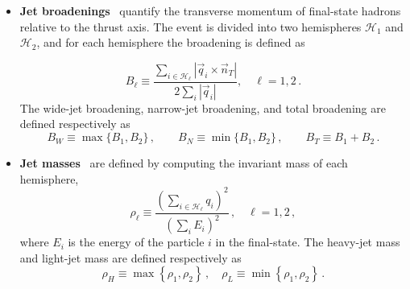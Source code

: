 \begin{itemize}
\begin{figure}[H]
\caption{Diagrammatic representation of thrust. Left: $\tau \to 0$ corresponds to a pencil-like 2-jet configuration, where the thrust axis $\vec{n}_T$ separates the event into two hemispheres, $\mathcal{H}_1$ and $\mathcal{H}_2$. Right:  $\tau \to 1/2$ corresponds to a spherically distributed, multi-particle final state.}
\label{fig:thrust}
\end{figure}


\item \textbf{Jet broadenings}~\cite{Clavelli:1979md, Rakow:1981qn, 
Catani:1992jc} quantify the transverse momentum of final-state hadrons 
relative to the thrust axis. The event is divided into two hemispheres 
$\mathcal{H}_1$ and $\mathcal{H}_2$, and for each hemisphere the 
broadening is defined as

\begin{equation}
	B_\ell \equiv \frac{\sum_{i \in \mathcal{H}_\ell} |\vec{q}_i \times \vec{n}_T|}{2 \sum_i |\vec{q}_i|}, \quad \ell = 1, 2\,.
\end{equation}
The wide-jet broadening, narrow-jet broadening, and total 
broadening are defined respectively as  
\begin{equation}
    B_W \equiv \max\{B_1, B_2\}\,, \qquad 
    B_N \equiv \min\{B_1, B_2\}\,, \qquad 
    B_T \equiv B_1 + B_2\,.
\end{equation}

\item{\textbf{Jet masses}}~\cite{Chandramohan:1980ry, Clavelli:1981yh} are defined by computing the invariant mass of each hemisphere,
\begin{equation}
	\rho_{\ell}\equiv \frac{\left(\sum_{i\in\mathcal{H}_{\ell}}q_i\right)^2}{\left(\sum_iE_i\right)^2}\,,\quad \ell=1, 2\,,
\end{equation}
where $E_i$ is the energy of the particle $i$ in the final-state.
The heavy-jet mass and light-jet mass are defined respectively as
\begin{equation}
	\rho_H\equiv\max\left\{\rho_1,\rho_2\right\}\,,\quad \rho_L\equiv\min\left\{\rho_1,\rho_2\right\}\,.
\end{equation}
\end{itemize}

